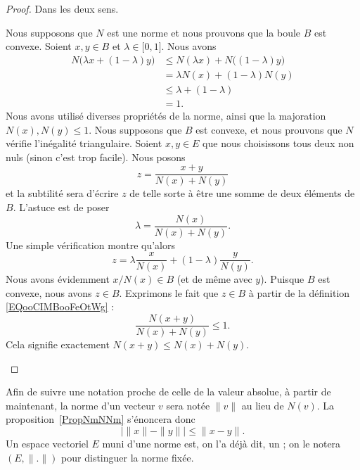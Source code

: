 \begin{proof}
	Dans les deux sens.
	\begin{subproof}
		\spitem[\( \Rightarrow\)]
		Nous supposons que \( N\) est une norme et nous prouvons que la boule \( B\) est convexe. Soient \( x,y\in B\) et \( \lambda\in \mathopen[ 0 , 1 \mathclose]\). Nous avons
		\begin{subequations}
			\begin{align}
				N\big( \lambda x+(1-\lambda)y \big) & \leq N(\lambda x)+N\big( (1-\lambda)y \big) \\
				                                    & = \lambda N(x)+(1-\lambda)N(y)              \\
				                                    & \leq \lambda +(1-\lambda)                   \\
				                                    & = 1.
			\end{align}
		\end{subequations}
		Nous avons utilisé diverses propriétés de la norme, ainsi que la majoration \( N(x), N(y)\leq 1\).
		\spitem[\( \Leftarrow\)]
		Nous supposons que \( B\) est convexe, et nous prouvons que \( N\) vérifie l'inégalité triangulaire. Soient \( x,y\in E\) que nous choisissons tous deux non nuls (sinon c'est trop facile). Nous posons
		\begin{equation}        \label{EQooCIMBooFeOtWg}
			z=\frac{ x+y }{ N(x)+N(y) }
		\end{equation}
		et la subtilité sera d'écrire \( z\) de telle sorte à être une somme de deux éléments de \( B\). L'astuce est de poser
		\begin{equation}
			\lambda=\frac{ N(x) }{ N(x)+N(y) }.
		\end{equation}
		Une simple vérification montre qu'alors
		\begin{equation}
			z = \lambda\frac{ x }{ N(x) }+  (1-\lambda) \frac{ y }{ N(y) }.
		\end{equation}
		Nous avons évidemment \( x/N(x)\in B\) (et de même avec \( y\)). Puisque \( B\) est convexe, nous avons \( z\in B\). Exprimons le fait que \( z\in B\) à partir de la définition \eqref{EQooCIMBooFeOtWg} :
		\begin{equation}
			\frac{ N(x+y) }{ N(x)+N(y) }\leq 1.
		\end{equation}
		Cela signifie exactement \( N(x+y)\leq N(x)+N(y)\).
	\end{subproof}
\end{proof}

\begin{normaltext}
	Afin de suivre une notation proche de celle de la valeur absolue, à partir de maintenant, la norme d'un vecteur \( v\) sera notée \( \| v\|\) au lieu de \( N(v)\). La proposition~\ref{PropNmNNm} s'énoncera donc
	\begin{equation}
		\big| \| x \|-\| y \| \big|\leq \| x-y \|.
	\end{equation}
	Un espace vectoriel \( E\) muni d'une norme est, on l'a déjà dit, un ; on le notera \( (E,\| . \|)\) pour distinguer la norme fixée.
\end{normaltext}


